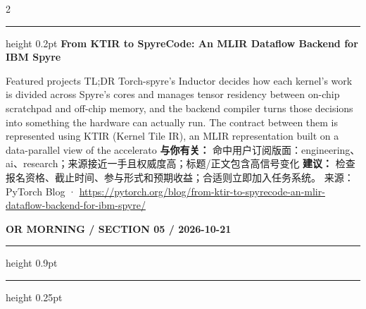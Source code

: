 \documentclass[10.5pt]{ctexart}
\begin{document}
\begin{multicols}{2}
\vspace{2mm}
\hrule height 0.2pt
\vspace{2mm}
{\large\bfseries From KTIR to SpyreCode: An MLIR Dataflow Backend for IBM Spyre}\par
Featured projects TL;DR Torch-spyre’s Inductor decides how each kernel’s work is divided across Spyre’s cores and manages tensor residency between on-chip scratchpad and off-chip memory, and the backend compiler turns those decisions into something the hardware can actually run. The contract between them is represented using KTIR (Kernel Tile IR), an MLIR representation built on a data-parallel view of the accelerato
\textbf{与你有关：} 命中用户订阅版面：engineering、ai、research；来源接近一手且权威度高；标题/正文包含高信号变化
\textbf{建议：} 检查报名资格、截止时间、参与形式和预期收益；合适则立即加入任务系统。
{\footnotesize\color{ormuted} 来源：PyTorch Blog · \url{https://pytorch.org/blog/from-ktir-to-spyrecode-an-mlir-dataflow-backend-for-ibm-spyre/}}
\end{multicols}
\newpage
{\small\bfseries OR MORNING / SECTION 05 / 2026-10-21}
\vspace{2mm}
\hrule height 0.9pt
\vspace{1.5mm}
\hrule height 0.25pt
\vspace{4mm}
\end{document}
